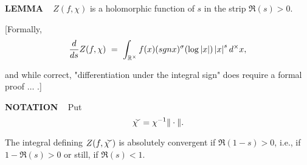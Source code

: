 \begin{x}{\small\bf LEMMA} \ %
$Z(f,\chi)$ is a holomorphic function of $s$ in the strip $\Re(s) > 0$.

[Formally, 
\[
\frac{d}{ds}Z(f,\chi) \ =\  \int_{\R^\times} f(x) (sgn x)^\sigma (\log \abs{x}) \abs{x}^s d^\times x,
\]

and while correct, "differentiation under the integral sign" does require a formal proof $\ldots$ .]
\end{x}

\vspace{0.1cm}

\begin{x}{\small\bf NOTATION} \ %
Put
\[
\widecheck{\chi} = \chi^{-1} \| \cdot \|.
\]

The integral defining $Z(f,\widecheck{\chi} )$ is absolutely convergent if $\Re(1-s) > 0$, i.e., if $1-\Re(s) > 0$ 
or still, if $\Re(s) < 1$.
\end{x}

\vspace{0.1cm}


